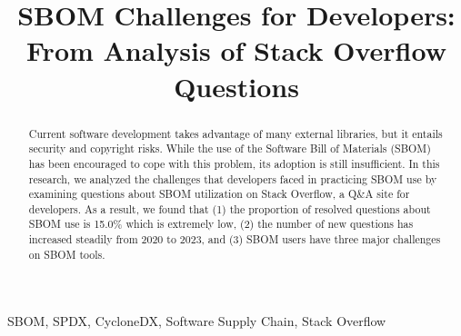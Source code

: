 \documentclass[conference]{IEEEtran}
\begin{document}
\title{SBOM Challenges for Developers: \\ From Analysis of Stack Overflow Questions}

\author{
}

\maketitle

\begin{abstract}
  Current software development takes advantage of many external libraries, but it entails security and copyright risks. While the use of the Software Bill of Materials (SBOM) has been encouraged to cope with this problem, its adoption is still insufficient. In this research, we analyzed the challenges that developers faced in practicing SBOM use by examining questions about SBOM utilization on Stack Overflow, a Q\&A site for developers. As a result, we found that (1) the proportion of resolved questions about SBOM use is 15.0\% which is extremely low, (2) the number of new questions has increased steadily from 2020 to 2023, and (3) SBOM users have three major challenges on SBOM tools.
\end{abstract}

\begin{IEEEkeywords}
  SBOM, SPDX, CycloneDX, Software Supply Chain, Stack Overflow
\end{IEEEkeywords}
\end{document}

